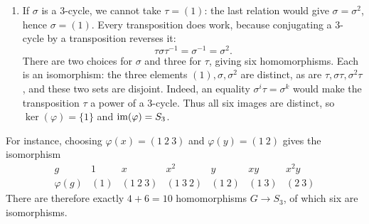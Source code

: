 \documentclass[reqno,11pt]{amsart}
\begin{document}
\begin{example}
\begin{enumerate}[label=\textbf{(\arabic*)}]
  \item If $\sigma$ is a $3$-cycle, we cannot take $\tau=(1)$:
  the last relation would give $\sigma=\sigma^2$, hence $\sigma=(1)$.
  Every transposition does work, because conjugating a $3$-cycle by a
  transposition reverses it:
  \[
    \tau\sigma\tau^{-1}=\sigma^{-1}=\sigma^2.
  \]
  There are two choices for $\sigma$ and three for $\tau$, giving six
  homomorphisms. Each is an isomorphism: the three elements
  $(1),\sigma,\sigma^2$ are distinct, as are
  $\tau,\sigma\tau,\sigma^2\tau$, and these two sets are disjoint.
  Indeed, an equality $\sigma^i\tau=\sigma^k$ would make the
  transposition $\tau$ a power of a $3$-cycle. Thus all six images are
  distinct, so $\ker(\varphi)=\{1\}$ and $\operatorname{im}(\varphi)=S_3$.
\end{enumerate}
For instance, choosing $\varphi(x)=(1\ 2\ 3)$ and
$\varphi(y)=(1\ 2)$ gives the isomorphism
\[
\begin{array}{c|cccccc}
  g&1&x&x^2&y&xy&x^2y\\ \hline
  \varphi(g)&(1)&(1\ 2\ 3)&(1\ 3\ 2)&(1\ 2)&(1\ 3)&(2\ 3)
\end{array}
\]
There are therefore exactly $4+6=10$ homomorphisms $G\to S_3$, of which
six are isomorphisms.
\end{example}

\end{document}

